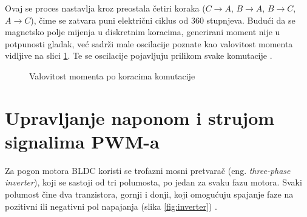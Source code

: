 \documentclass[diplomskirad, upload]{fer}
\begin{document}
Ovaj se proces nastavlja kroz preostala četiri koraka ($C \to A$, $B \to A$, $B
	\to C$, $A \to C$), čime se zatvara puni električni ciklus od 360 stupnjeva.
Budući da se magnetsko polje mijenja u diskretnim koracima, generirani moment
nije u potpunosti gladak, već sadrži male oscilacije poznate kao valovitost
momenta vidljive na slici \ref{fig:valovitost_momenta}. Te se oscilacije
pojavljuju prilikom svake komutacije \cite{TI2015}. \label{trap:torque-ripple}
\begin{figure}[h!]
	\centering
	\caption{Valovitost momenta po koracima komutacije}
	\label{fig:valovitost_momenta}
\end{figure}
\newpage

\section{Upravljanje naponom i strujom signalima PWM-a}
\label{sec:trofazno_upravljanje}

Za pogon motora BLDC koristi se trofazni mosni pretvarač (eng.
\textit{three-phase inverter}), koji se sastoji od tri polumosta, po jedan za
svaku fazu motora. Svaki polumost čine dva tranzistora, gornji i donji, koji
omogućuju spajanje faze na pozitivni ili negativni pol napajanja (slika
\ref{fig:inverter}) \cite{TI2015,ST_AN1946,MicrochipAN885}.
\end{document}
